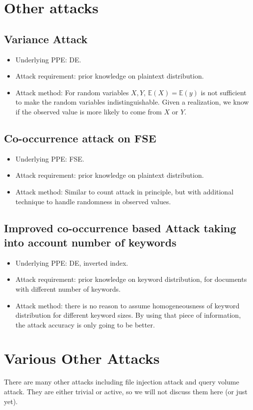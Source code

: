 \documentclass[12pt]{article}
\begin{document}
\section{Other attacks}
\subsection{Variance Attack}
\begin{itemize}
	\item Underlying PPE: DE.
	
	\item Attack requirement: prior knowledge on plaintext distribution.
	
	\item Attack method: For random variables $X,Y$, $\mathbb{E}(X) = \mathbb{E}(y)$ is not sufficient to make the random variables indistinguishable. Given a realization, we know if the observed value is more likely to come from $X$ or $Y$.
\end{itemize}


\subsection{Co-occurrence attack on FSE}
\begin{itemize}
	\item Underlying PPE: FSE.
	
	\item Attack requirement: prior knowledge on plaintext distribution.
	
	\item Attack method: Similar to count attack in principle, but with additional technique to handle randomness in observed values.
\end{itemize}


\subsection{Improved co-occurrence based Attack taking into account number of keywords}
\begin{itemize}
	\item Underlying PPE: DE, inverted index.
	
	\item Attack requirement: prior knowledge on keyword distribution, for documents with different number of keywords.
	
	\item Attack method: there is no reason to assume homogeneousness of keyword distribution for different keyword sizes. By using that piece of information, the attack accuracy is only going to be better. 
\end{itemize}




\section{Various Other Attacks}
There are many other attacks including file injection attack and query volume attack. They are either trivial or active, so we will not discuss them here (or just yet).
\end{document}
